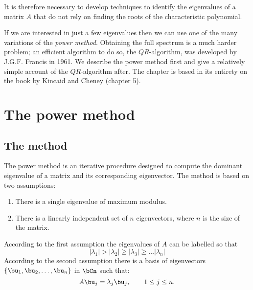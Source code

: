 \smallskip

It is therefore necessary to develop techniques to identify the
eigenvalues of a matrix $A$ that do not rely on finding the roots of
the characteristic polynomial.

If we are interested in just a few eigenvalues then we can use one of
the many variations of the \textit{power method}.  Obtaining the full
spectrum is a much harder problem; an efficient algorithm to do so,
the $QR$-algorithm, was developed by J.G.F. Francis in 1961.  We
describe the power method first and give a relatively simple account
of the $QR$-algorithm after.  The chapter is based in its entirety on
the book by Kincaid and Cheney (chapter 5).%

\section{The power method}

\subsection{The method}

The power method is an iterative procedure designed to compute the
dominant eigenvalue of a matrix and its corresponding eigenvector.
The method is based on two assumptions:

\begin{enumerate}
\item There is a single eigenvalue of maximum modulus.
\item There is a linearly independent set of $n$ eigenvectors, where
  $n$ is the size of the matrix.
\end{enumerate}

According to the first assumption the eigenvalues of $A$ can be
labelled so that
%
\begin{equation*}
 |\lambda_1| > | \lambda_2 | \ge | \lambda_3 | \ge \ldots |\lambda_n|
\end{equation*}
%
According to the second assumption there is a basis of eigenvectors
$\{\bu_1, \bu_2, \ldots, \bu_n\}$ in $\bCn$ such that:
%
\begin{equation*}
 A \bu_j = \lambda_j \bu_j , \qquad 1 \le j \le n .
\end{equation*}

